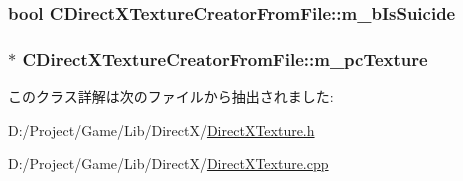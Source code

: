 \subsubsection[{m\+\_\+b\+Is\+Suicide}]{\setlength{\rightskip}{0pt plus 5cm}bool C\+Direct\+X\+Texture\+Creator\+From\+File\+::m\+\_\+b\+Is\+Suicide\hspace{0.3cm}{\ttfamily [private]}}\label{class_c_direct_x_texture_creator_from_file_ac362400f47c6bd70ddf171af97eea74b}
\hypertarget{class_c_direct_x_texture_creator_from_file_a81e5071041c6ebec32e1aeadc1bdcdbe}{}
\subsubsection[{m\+\_\+pc\+Texture}]{$\ast$ C\+Direct\+X\+Texture\+Creator\+From\+File\+::m\+\_\+pc\+Texture\hspace{0.3cm}{\ttfamily [private]}}\label{class_c_direct_x_texture_creator_from_file_a81e5071041c6ebec32e1aeadc1bdcdbe}


このクラス詳解は次のファイルから抽出されました\+:\begin{DoxyCompactItemize}
\item 
D\+:/\+Project/\+Game/\+Lib/\+Direct\+X/\hyperlink{_direct_x_texture_8h}{Direct\+X\+Texture.\+h}\item 
D\+:/\+Project/\+Game/\+Lib/\+Direct\+X/\hyperlink{_direct_x_texture_8cpp}{Direct\+X\+Texture.\+cpp}\end{DoxyCompactItemize}
